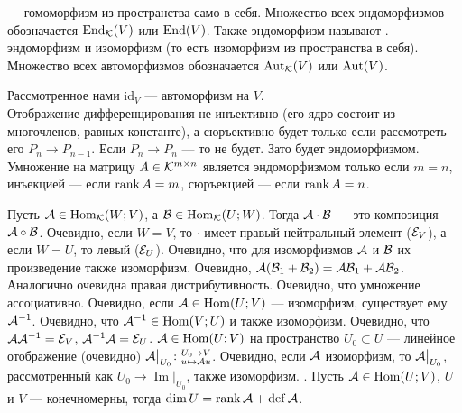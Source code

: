 \documentclass{article}
\DeclareMathOperator{\operIm}{Im}
\let\Im\operIm
\newcommand*{\id}{{\scriptE}}
\begin{document}
\begin{itemize}
        \dfn {} --- гомоморфизм из пространства само в себя. Множество всех эндоморфизмов обозначается $\operatorname{End}_{\mathcal{K}}(V)$ или $\operatorname{End}(V)$. Также эндоморфизм называют .
        \dfn {} --- эндоморфизм и изоморфизм (то есть изоморфизм из пространства в себя). Множество всех автоморфизмов обозначается $\operatorname{Aut}_{\mathcal{K}}(V)$ или $\operatorname{Aut}(V)$.
        \begin{Example}
            Рассмотренное нами $\mathrm{id}_V$ --- автоморфизм на $V$.\\
            Отображение дифференцирования не инъективно (его ядро состоит из многочленов, равных константе), а сюръективно будет только если рассмотреть его $P_n\to P_{n-1}$. Если $P_n\to P_n$ --- то не будет. Зато будет эндоморфизмом.\\
            Умножение на матрицу $A\in{\mathcal{K}}^{m\times n}$ является эндоморфизмом только если $m=n$, инъекцией --- если $\operatorname{rank} A=m$, сюръекцией --- если $\operatorname{rank} A=n$.
        \end{Example}
        \dfn Пусть ${\mathcal{A}}\in\operatorname{Hom}_{\mathcal{K}}(W;V)$, а ${\mathcal{B}}\in\operatorname{Hom}_{\mathcal{K}}(U;W)$. Тогда  ${\mathcal{A}}\cdot{\mathcal{B}}$ --- это композиция ${\mathcal{A}}\circ{\mathcal{B}}$.
        \thm Очевидно, если $W=V$, то $\cdot$ имеет правый нейтральный элемент ($\id_V$), а если $W=U$, то левый ($\id_U$).
        \thm Очевидно, что для изоморфизмов ${\mathcal{A}}$ и ${\mathcal{B}}$ их произведение также изоморфизм.
        \thm Очевидно, ${\mathcal{A}}({\mathcal{B}}_1+{\mathcal{B}}_2)={\mathcal{A}}{\mathcal{B}}_1+{\mathcal{A}}{\mathcal{B}}_2$. Аналогично очевидна правая дистрибутивность.
        \thm Очевидно, что умножение ассоциативно.
        \dfn Очевидно, если ${\mathcal{A}}\in\operatorname{Hom}(U;V)$ --- изоморфизм, существует  ему  ${\mathcal{A}}^{-1}$.
        \thm Очевидно, что ${\mathcal{A}}^{-1}\in\operatorname{Hom}(V;U)$ и также изоморфизм.
        \thm Очевидно, что $\scriptA\scriptA^{-1}=\id_V$, $\scriptA^{-1}\scriptA=\id_U$.
        \dfn {} ${\mathcal{A}}\in\operatorname{Hom}(U;V)$ на пространство $U_0\subset U$ --- линейное отображение (очевидно) ${\mathcal{A}}\big|_{U_0}\colon\substack{U_0\to V\\u\mapsto{\mathcal{A}} u}$.
        \thm Очевидно, если ${\mathcal{A}}$ изоморфизм, то ${\mathcal{A}}\big|_{U_0}$, рассмотренный как $U_0\to\Im\big|_{U_0}$, также изоморфизм.
        \thm {}. Пусть ${\mathcal{A}}\in\operatorname{Hom}(U;V)$, $U$ и $V$ --- конечномерны, тогда $\dim U=\operatorname{rank}{\mathcal{A}}+\operatorname{def}{\mathcal{A}}$.

\end{itemize}
\end{document}
